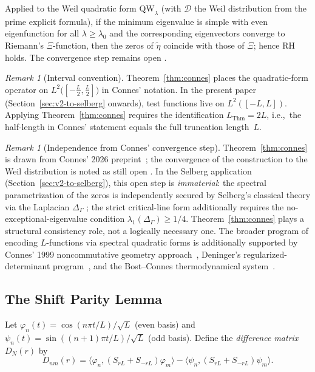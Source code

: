 \documentclass[12pt,a4paper]{article}
\theoremstyle{definition}
\theoremstyle{remark}
\newtheorem{remark}[theorem]{Remark}
\newcommand{\QW}{\mathrm{QW}}
\newcommand{\Delop}{\Delta_{\Gamma}}
\begin{document}
Applied to the Weil quadratic form $\QW_\lambda$ (with $\mathcal{D}$ the Weil
distribution from the prime explicit formula), if the minimum eigenvalue is
simple with even eigenfunction for all $\lambda\ge\lambda_0$ and the
corresponding eigenvectors converge to Riemann's $\Xi$-function, then the
zeros of $\tilde\eta$ coincide with those of $\Xi$; hence RH holds.  The
convergence step remains open \cite[\S6.6]{Connes2026}.

\begin{remark}[Interval convention]
\label{rem:interval-convention}
Theorem~\ref{thm:connes} places the quadratic-form operator on
$L^2\!\bigl([-\tfrac{L}{2},\tfrac{L}{2}]\bigr)$ in Connes' notation.
In the present paper (Section~\ref{sec:v2-to-selberg} onwards),
test functions live on $L^2([-L,L])$.  Applying
Theorem~\ref{thm:connes} requires the identification $L_{\mathrm{Thm}} = 2L$,
i.e.,\ the half-length in Connes' statement equals the full truncation length~$L$.
\end{remark}

\begin{remark}[Independence from Connes' convergence step]
\label{rem:connes-hedge}
Theorem~\ref{thm:connes} is drawn from Connes' 2026 preprint~\cite{Connes2026};
the convergence of the construction to the Weil distribution is noted as still open
\cite[\S6.6]{Connes2026}.  In the Selberg application
(Section~\ref{sec:v2-to-selberg}), this open step is \emph{immaterial}: the
spectral parametrization of the zeros is independently secured by Selberg's
classical theory via the Laplacian $\Delop$ \cite{Selberg1956}; the strict
critical-line form additionally requires the no-exceptional-eigenvalue
condition $\lambda_1(\Delop)\ge 1/4$.
Theorem~\ref{thm:connes} plays a structural consistency role, not a logically
necessary one.  The broader program of encoding $L$-functions via spectral
quadratic forms is additionally supported by Connes' 1999 noncommutative
geometry approach~\cite{Connes1999}, Deninger's regularized-determinant
program~\cite{Deninger1994}, and the Bost--Connes thermodynamical system~\cite{BostConnes1995}.
\end{remark}

\subsection{The Shift Parity Lemma}

Let $\varphi_n(t) = \cos(n\pi t/L)/\sqrt{L}$ (even basis) and
$\psi_n(t) = \sin((n+1)\pi t/L)/\sqrt{L}$ (odd basis). Define the
\emph{difference matrix} $D_N(r)$ by
\begin{equation}
\label{eq:DN}
D_{nm}(r) = \langle\varphi_n, (S_{rL}+S_{-rL})\varphi_m\rangle - \langle\psi_n, (S_{rL}+S_{-rL})\psi_m\rangle.
\end{equation}
\end{document}
